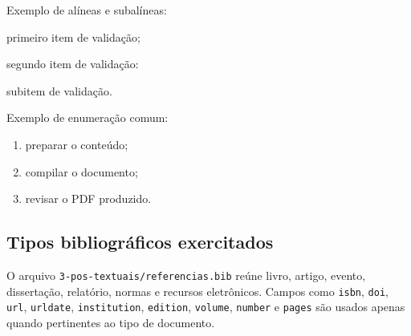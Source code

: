 

Exemplo de alíneas e subalíneas:

\begin{ufcalineas}
  \item primeiro item de validação;
  \item segundo item de validação:
    \begin{ufcsubalineas}
      \item subitem de validação.
    \end{ufcsubalineas}
\end{ufcalineas}

Exemplo de enumeração comum:

\begin{enumerate}
  \item preparar o conteúdo;
  \item compilar o documento;
  \item revisar o PDF produzido.
\end{enumerate}

\subsection{Tipos bibliográficos exercitados}

O arquivo \texttt{3-pos-textuais/referencias.bib} reúne livro, artigo, evento, dissertação, relatório, normas e recursos eletrônicos. Campos como \texttt{isbn}, \texttt{doi}, \texttt{url}, \texttt{urldate}, \texttt{institution}, \texttt{edition}, \texttt{volume}, \texttt{number} e \texttt{pages} são usados apenas quando pertinentes ao tipo de documento.

\nocite{lamport1994,wessberg2000,vaswani2017attention,almeida2018,rfc9110}

